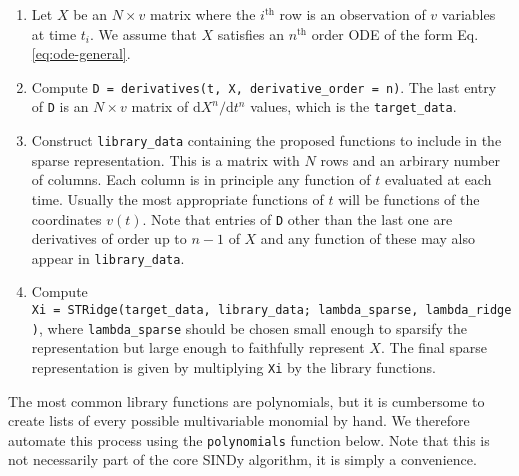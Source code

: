 \documentclass[
]{article}
\providecommand{\tightlist}{%
  \setlength{\itemsep}{0pt}\setlength{\parskip}{0pt}}\usepackage{longtable,booktabs,array}
\begin{document}
\begin{tcolorbox}[enhanced jigsaw, colback=white, coltitle=black, rightrule=.15mm, opacitybacktitle=0.6, leftrule=.75mm, arc=.35mm, toprule=.15mm, breakable, opacityback=0, title={SINDy {[}standard{]}}, bottomtitle=1mm, toptitle=1mm, bottomrule=.15mm, colbacktitle=quarto-callout-tip-color!10!white, titlerule=0mm, colframe=quarto-callout-tip-color-frame, left=2mm]

\begin{enumerate}
\def\labelenumi{\arabic{enumi}.}
\tightlist
\item
  Let \(X\) be an \(N \times v\) matrix where the \(i^\text{th}\) row is
  an observation of \(v\) variables at time \(t_i\). We assume that
  \(X\) satisfies an \(n^\text{th}\) order ODE of the form Eq.
  \eqref{eq:ode-general}.
\item
  Compute \texttt{D\ =\ derivatives(t,\ X,\ derivative\_order\ =\ n)}.
  The last entry of \texttt{D} is an \(N \times v\) matrix of
  \(\text{d}X^n/\text{d}t^n\) values, which is the
  \texttt{target\_data}.
\item
  Construct \texttt{library\_data} containing the proposed functions to
  include in the sparse representation. This is a matrix with \(N\) rows
  and an arbirary number of columns. Each column is in principle any
  function of \(t\) evaluated at each time. Usually the most appropriate
  functions of \(t\) will be functions of the coordinates \(v(t)\). Note
  that entries of \texttt{D} other than the last one are derivatives of
  order up to \(n - 1\) of \(X\) and any function of these may also
  appear in \texttt{library\_data}.
\item
  Compute
  \texttt{Xi\ =\ STRidge(target\_data,\ library\_data;\ lambda\_sparse,\ lambda\_ridge)},
  where \texttt{lambda\_sparse} should be chosen small enough to
  sparsify the representation but large enough to faithfully represent
  \(X\). The final sparse representation is given by multiplying
  \texttt{Xi} by the library functions.
\end{enumerate}

\end{tcolorbox}

The most common library functions are polynomials, but it is cumbersome
to create lists of every possible multivariable monomial by hand. We
therefore automate this process using the \texttt{polynomials} function
below. Note that this is not necessarily part of the core SINDy
algorithm, it is simply a convenience.
\end{document}
